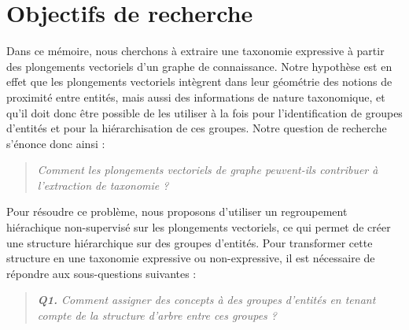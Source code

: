 




\section{Objectifs de recherche}  %

Dans ce mémoire, nous cherchons à extraire une taxonomie expressive à partir des plongements vectoriels d'un graphe de connaissance.
%
Notre hypothèse est en effet que les plongements vectoriels intègrent dans leur géométrie des notions de proximité entre entités, mais aussi des informations de nature taxonomique, et
%
qu'il doit donc être possible de les utiliser à la fois pour l'identification de groupes d'entités et pour la hiérarchisation de ces groupes. 
%
Notre question de recherche s'énonce donc ainsi :

\begin{quote}
    \emph{Comment les plongements vectoriels de graphe peuvent-ils contribuer à l'extraction de taxonomie ?}
\end{quote}




Pour résoudre ce problème, nous proposons d'utiliser un regroupement hiérachique non-supervisé sur les plongements vectoriels, ce qui permet de créer une structure hiérarchique sur des groupes d'entités. Pour transformer cette structure en une taxonomie expressive ou non-expressive, il est nécessaire de répondre aux sous-questions suivantes :
%
\begin{quote}
    \emph{\textbf{Q1.} Comment assigner des concepts à des groupes d'entités en tenant compte de la structure d'arbre entre ces groupes ?}
\end{quote}

